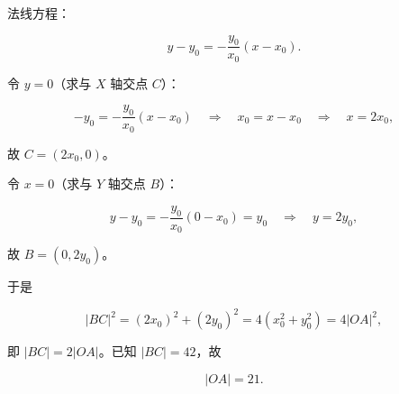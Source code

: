 \begin{answer}
法线方程：

\nopagebreak[4]
\[
y-y_0=-\frac{y_0}{x_0}(x-x_0).
\]

令 $y=0$（求与 $X$ 轴交点 $C$）：

\nopagebreak[4]
\[
-y_0=-\frac{y_0}{x_0}(x-x_0)
\quad\Longrightarrow\quad
x_0=x-x_0
\quad\Longrightarrow\quad
x=2x_0,
\]

故 $C=(2x_0,0)$。

令 $x=0$（求与 $Y$ 轴交点 $B$）：

\nopagebreak[4]
\[
y-y_0=-\frac{y_0}{x_0}(0-x_0)=y_0
\quad\Longrightarrow\quad
y=2y_0,
\]

故 $B=(0,2y_0)$。

于是

\nopagebreak[4]
\[
|BC|^2=(2x_0)^2+(2y_0)^2=4(x_0^2+y_0^2)=4|OA|^2,
\]

即 $|BC|=2|OA|$。已知 $|BC|=42$，故

\nopagebreak[4]
\[
|OA|=21.
\]


\end{answer}
